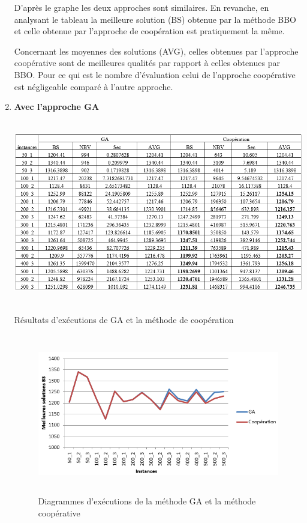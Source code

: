 \begin{enumerate}[label=\alph*)]
D’après le graphe les deux approches sont similaires. En revanche, en analysant le tableau la meilleure solution (BS) obtenue par la méthode BBO et celle obtenue par l’approche de coopération est pratiquement  la même.

Concernant les moyennes des solutions (AVG), celles obtenues par l’approche coopérative sont de meilleures qualités par rapport à celles obtenues par BBO.
Pour ce qui est le nombre d’évaluation  celui de l’approche coopérative est négligeable comparé à l’autre approche. 

	\item \textbf{Avec l’approche GA}
\begin{table}[H]
	\includegraphics[width=15cm,height=8cm]{Chap5/t4.png}
	\caption{Résultats d’exécutions de GA et la méthode de coopération}
	\label{tab:4}
\end{table}

\begin{figure}[H]
	\centering
	\includegraphics[width=16cm,height=7cm]{Chap5/4.png}
	\caption{Diagrammes d’exécutions de la méthode GA et la méthode coopérative}
	\label{fig:DEMGAMC}
\end{figure}


\end{enumerate}
